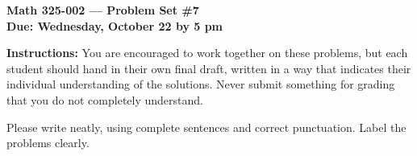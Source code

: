 \documentclass{amsart}
\begin{document}
\begin{center}
{\large\bfseries
Math 325-002 --- Problem Set \#7\\
Due: Wednesday, October 22 by 5 pm}
\end{center}





{\bf Instructions:} You are encouraged to work together on these
problems, but each student should hand in their own final draft,
written in a way that indicates their individual understanding of
the solutions. Never submit something for grading
that you do not completely understand. 

Please write neatly, using complete sentences and correct
punctuation. Label the problems clearly. 
\end{document}
